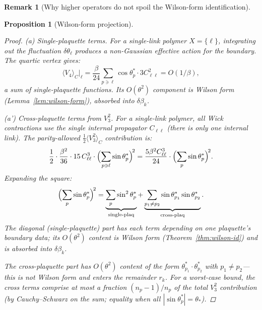\documentclass[11pt]{article}
\newtheorem{proposition}[theorem]{Proposition}
\theoremstyle{definition}
\newtheorem{remark}[theorem]{Remark}
\begin{document}
\begin{remark}[Why higher operators do not spoil the Wilson-form identification]
\begin{proposition}[Wilson-form projection]
\begin{enumerate}[nosep,label=(\roman*)]
\begin{proof}
\emph{(a) Single-plaquette terms.}
For a single-link polymer $X=\{\ell\}$, integrating out
the fluctuation $\delta\theta_\ell$ produces a non-Gaussian
effective action for the boundary.  The quartic vertex gives:
\begin{equation}
\langle V_4\rangle_C\big|_\ell
=\frac{\beta}{24}\sum_{p\ni\ell}\cos\theta_p^*\cdot
3C_{\ell\ell}^2=O(1/\beta),
\end{equation}
a sum of single-plaquette functions.
Its $O(\theta^2)$ component is
Wilson form (Lemma~\ref{lem:wilson-form}), absorbed into
$\delta\beta_k$.

\emph{(a') Cross-plaquette terms from $V_3^2$.}
For a single-link polymer, all Wick contractions use
the \emph{single} internal propagator $C_{\ell\ell}$
(there is only one internal link).  The parity-allowed
$\frac{1}{2}\langle V_3^2\rangle_C$ contribution is:
\begin{equation}\label{eq:V3sq}
\frac{1}{2}\cdot\frac{\beta^2}{36}\cdot
15\,C_{\ell\ell}^3\cdot
\Bigl(\sum_{p\ni\ell}\sin\theta_p^*\Bigr)^{\!2}
=\frac{5\beta^2C_{\ell\ell}^3}{24}\cdot
\Bigl(\sum_p\sin\theta_p^*\Bigr)^{\!2}.
\end{equation}
Expanding the square:
\begin{equation}
\Bigl(\sum_p\sin\theta_p^*\Bigr)^{\!2}
=\underbrace{\sum_p\sin^2\theta_p^*}
_{\text{single-plaq}}
+\underbrace{\sum_{p_1\ne p_2}
\sin\theta_{p_1}^*\sin\theta_{p_2}^*}
_{\text{cross-plaq}}.
\end{equation}
The diagonal (single-plaquette) part has each term depending on
one plaquette's boundary data; its $O(\theta^2)$ content is
Wilson form (Theorem~\ref{thm:wilson-id}) and is absorbed into $\delta\beta_k$.

The cross-plaquette part has $O(\theta^2)$ content of the form
$\theta_{p_1}^*\cdot\theta_{p_2}^*$ with $p_1\ne p_2$---this
is \emph{not} Wilson form and enters the remainder $r_k$.
For a worst-case bound, the cross terms comprise at most a
fraction $(n_p{-}1)/n_p$ of the total $V_3^2$ contribution
(by Cauchy--Schwarz on the sum; equality when all
$|\sin\theta_p^*|=\theta_*$).


\end{proof}
\end{enumerate}
\end{proposition}
\end{remark}
\end{document}
